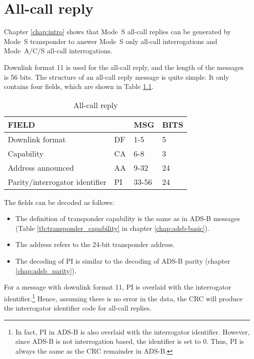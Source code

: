 \chapter{All-call reply}

Chapter \ref{chap:intro} shows that Mode~S all-call replies can be generated by Mode~S transponder to answer Mode~S only all-call interrogations and Mode~A/C/S all-call interrogations.

Downlink format 11 is used for the all-call reply, and the length of the messages is 56 bits. The structure of an all-call reply message is quite simple. It only contains four fields, which are shown in Table \ref{tb:df11_structure}.

\begin{table}[ht]
\caption{All-call reply}
\label{tb:df11_structure}
\begin{tabular}{|l|l|l|l|}
\hline
\textbf{FIELD} & \textbf{} & \textbf{MSG} & \textbf{BITS} \\ \hline
Downlink format & DF & 1-5 & 5 \\ \hline
Capability & CA & 6-8 & 3 \\ \hline
Address announced & AA & 9-32 & 24 \\ \hline
Parity/interrogator identifier & PI & 33-56 & 24 \\ \hline
\end{tabular}
\end{table}

The fields can be decoded as follows:

\begin{itemize}
  \item The definition of transponder capability is the same as in ADS-B messages (Table \ref{tb:transponder_capability} in chapter \ref{chap:adsb-basic}).

  \item The address refers to the 24-bit transponder address.

  \item The decoding of PI is similar to the decoding of ADS-B parity (chapter \ref{chap:adsb_parity}). 
\end{itemize}

For a message with downlink format 11, PI is overlaid with the interrogator identifier.\footnote{In fact, PI in ADS-B is also overlaid with the interrogator identifier. However, since ADS-B is not interrogation based, the identifier is set to 0. Thus, PI is always the same as the CRC remainder in ADS-B.} Hence, assuming there is no error in the data, the CRC will produce the interrogator identifier code for all-call replies.


